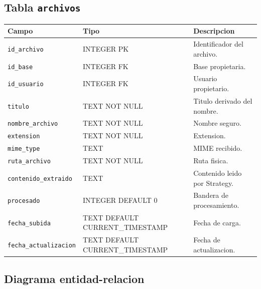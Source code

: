 \documentclass[12pt,a4paper]{article}
\begin{document}
\subsection{Tabla \texttt{archivos}}

\begin{longtable}{|p{4cm}|p{3cm}|p{7cm}|}
\hline
\textbf{Campo} & \textbf{Tipo} & \textbf{Descripcion} \\
\hline
\texttt{id\_archivo} & INTEGER PK & Identificador del archivo. \\
\hline
\texttt{id\_base} & INTEGER FK & Base propietaria. \\
\hline
\texttt{id\_usuario} & INTEGER FK & Usuario propietario. \\
\hline
\texttt{titulo} & TEXT NOT NULL & Titulo derivado del nombre. \\
\hline
\texttt{nombre\_archivo} & TEXT NOT NULL & Nombre seguro. \\
\hline
\texttt{extension} & TEXT NOT NULL & Extension. \\
\hline
\texttt{mime\_type} & TEXT & MIME recibido. \\
\hline
\texttt{ruta\_archivo} & TEXT NOT NULL & Ruta fisica. \\
\hline
\texttt{contenido\_extraido} & TEXT & Contenido leido por Strategy. \\
\hline
\texttt{procesado} & INTEGER DEFAULT 0 & Bandera de procesamiento. \\
\hline
\texttt{fecha\_subida} & TEXT DEFAULT CURRENT\_TIMESTAMP & Fecha de carga. \\
\hline
\texttt{fecha\_actualizacion} & TEXT DEFAULT CURRENT\_TIMESTAMP & Fecha de actualizacion. \\
\hline
\end{longtable}

\subsection{Diagrama entidad-relacion}
\end{document}
